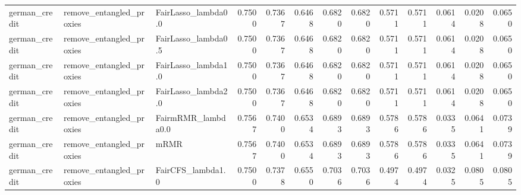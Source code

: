 \begin{tabular}{lllrrrrrrrrrr}
german_credit & remove_entangled_proxies & FairLasso_lambda0.0 & 0.7500 & 0.7367 & 0.6468 & 0.6820 & 0.6820 & 0.5711 & 0.5711 & 0.0614 & 0.0208 & 0.0650 \\
german_credit & remove_entangled_proxies & FairLasso_lambda0.5 & 0.7500 & 0.7367 & 0.6468 & 0.6820 & 0.6820 & 0.5711 & 0.5711 & 0.0614 & 0.0208 & 0.0650 \\
german_credit & remove_entangled_proxies & FairLasso_lambda1.0 & 0.7500 & 0.7367 & 0.6468 & 0.6820 & 0.6820 & 0.5711 & 0.5711 & 0.0614 & 0.0208 & 0.0650 \\
german_credit & remove_entangled_proxies & FairLasso_lambda2.0 & 0.7500 & 0.7367 & 0.6468 & 0.6820 & 0.6820 & 0.5711 & 0.5711 & 0.0614 & 0.0208 & 0.0650 \\
german_credit & remove_entangled_proxies & FairmRMR_lambda0.0 & 0.7567 & 0.7400 & 0.6534 & 0.6893 & 0.6893 & 0.5786 & 0.5786 & 0.0335 & 0.0641 & 0.0739 \\
german_credit & remove_entangled_proxies & mRMR & 0.7567 & 0.7400 & 0.6534 & 0.6893 & 0.6893 & 0.5786 & 0.5786 & 0.0335 & 0.0641 & 0.0739 \\
german_credit & remove_entangled_proxies & FairCFS_lambda1.0 & 0.7500 & 0.7378 & 0.6550 & 0.7036 & 0.7036 & 0.4974 & 0.4974 & 0.0325 & 0.0805 & 0.0805 \\
\bottomrule
\end{tabular}
